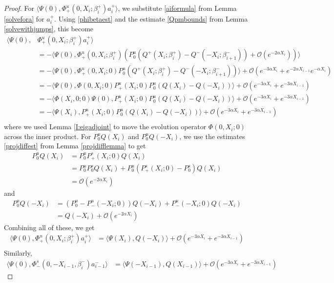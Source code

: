\documentclass[thesis.tex]{subfiles}
\begin{document}
\begin{lemma}
\begin{proof}
For $\langle \Psi(0), \Phi^u_+(0, X_i; \beta_i^+) a_i^+ \rangle$, we substitute \eqref{aiformula} from Lemma \ref{solvefora} for $a_i^+$. Using \eqref{phibetaest} and the estimate \eqref{Qpmbounds} from Lemma \ref{solvewithjumps}, this become
\begin{align*}
\langle \Psi(0), &\Phi^u_+(0, X_i; \beta_i^+) a_i^+ \rangle \\
&= -\langle \Psi(0), \Phi^u_+(0, X_i; \beta_i^+)\left( P^u_0 ( Q^+(X_i; \beta_i^+) - Q^-(-X_i; \beta_{i+1}^-)) + \mathcal{O}( e^{-2 \alpha X_i} ) \right) \rangle \\
&= -\langle \Psi(0), \Phi^u_+(0, X_i; 0) P^u_0 \left( Q^+(X_i; \beta_i^+) - Q^-(-X_i; \beta_{i+1}^-) \right) \rangle + \mathcal{O}( e^{-3 \alpha X_i} + e^{-2\alpha X_{i-1}}e^{-\alpha X_i} )\\
&= -\langle \Psi(0), \Phi(0, X_i; 0) P^u_+(X_i; 0) P^u_0 \left( Q(X_i) - Q(-X_i) \right) \rangle + \mathcal{O}( e^{-3 \alpha X_i} + e^{-3\alpha X_{i-1}})\\
&= -\langle \Phi(X_i, 0; 0) \Psi(0), P^u_+(X_i; 0) P^u_0 \left( Q(X_i) - Q(-X_i) \right) \rangle + \mathcal{O}( e^{-3 \alpha X_i} + e^{-3\alpha X_{i-1}})\\
&= -\langle \Psi(X_i), P^u_+(X_i; 0) P^u_0 \left( Q(X_i) - Q(-X_i) \right) \rangle + \mathcal{O}( e^{-3 \alpha X_i} + e^{-3\alpha X_{i-1}})\\
\end{align*}
where we used Lemma \ref{I:eigadjoint} to move the evolution operator $\Phi(0, X_i; 0)$ across the inner product.
For $P^u_0 Q(X_i)$ and $P^u_0 Q(-X_i)$, we use the estimates \eqref{projdiffest} from Lemma \ref{projdifflemma} to get
\begin{align*}
P^u_0 Q(X_i) &= P^u_0 P^s_+(X_i; 0) Q(X_i) \\
&= P^u_0 P^s_0 Q(X_i) + P^u_0 ( P^s_+(X_i; 0) - P^s_0) Q(X_i) \\
&= \mathcal{O}(e^{-2\alpha X_i})
\end{align*}
and
\begin{align*}
P^u_0 Q(-X_i) &= (P^u_0 - P^u_-(-X_i; 0)) Q(-X_i) + P^u_-(-X_i; 0) Q(-X_i) \\
&= Q(-X_i) + \mathcal{O}(e^{-2\alpha X_i})
\end{align*}
Combining all of these, we get
\begin{align*}
\langle \Psi(0), \Phi^u_+(0, X_i; \beta_i^+) a_i^+ \rangle 
&= \langle \Psi(X_i), Q(-X_i) \rangle + \mathcal{O}( e^{-3 \alpha X_i} + e^{-3\alpha X_{i-1}})\\
\end{align*}
Similarly,
\begin{align*}
\langle \Psi(0), \Phi^s_-(0, -X_{i-1}, \beta_i^-) a_{i-1}^- \rangle &= 
\langle \Psi(-X_{i-1}), Q(X_{i-1}) \rangle + \mathcal{O}( e^{-3 \alpha X_i} + e^{-3\alpha X_{i-1}})
\end{align*}


\end{proof}
\end{lemma}
\end{document}
